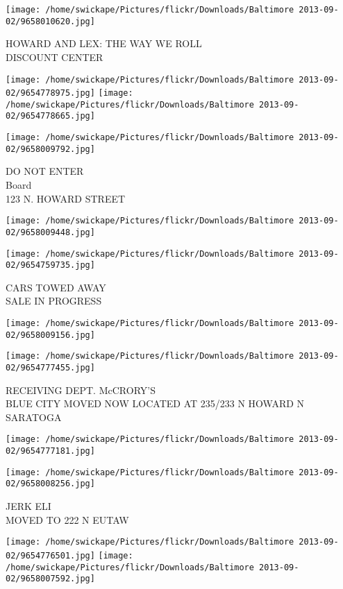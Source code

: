 \documentclass[10pt,letterpaper]{article}
\begin{document}
\vspace{0.25in}
\texttt{[image: /home/swickape/Pictures/flickr/Downloads/Baltimore 2013-09-02/9658010620.jpg]}

HOWARD AND LEX: THE WAY WE ROLL\\
DISCOUNT CENTER
\pagebreak

\texttt{[image: /home/swickape/Pictures/flickr/Downloads/Baltimore 2013-09-02/9654778975.jpg]}
\texttt{[image: /home/swickape/Pictures/flickr/Downloads/Baltimore 2013-09-02/9654778665.jpg]}

\vspace{0.25in}
\texttt{[image: /home/swickape/Pictures/flickr/Downloads/Baltimore 2013-09-02/9658009792.jpg]}

DO NOT ENTER\\
Board\\
123 N. HOWARD STREET
\pagebreak

\texttt{[image: /home/swickape/Pictures/flickr/Downloads/Baltimore 2013-09-02/9658009448.jpg]}

\vspace{0.25in}
\texttt{[image: /home/swickape/Pictures/flickr/Downloads/Baltimore 2013-09-02/9654759735.jpg]}

CARS TOWED AWAY\\
SALE IN PROGRESS
\pagebreak

\texttt{[image: /home/swickape/Pictures/flickr/Downloads/Baltimore 2013-09-02/9658009156.jpg]}

\vspace{0.25in}
\texttt{[image: /home/swickape/Pictures/flickr/Downloads/Baltimore 2013-09-02/9654777455.jpg]}

RECEIVING DEPT. McCRORY'S\\
BLUE CITY MOVED NOW LOCATED AT 235/233 N HOWARD N SARATOGA
\pagebreak

\texttt{[image: /home/swickape/Pictures/flickr/Downloads/Baltimore 2013-09-02/9654777181.jpg]}

\vspace{0.25in}
\texttt{[image: /home/swickape/Pictures/flickr/Downloads/Baltimore 2013-09-02/9658008256.jpg]}

JERK ELI\\
MOVED TO 222 N EUTAW
\pagebreak

\texttt{[image: /home/swickape/Pictures/flickr/Downloads/Baltimore 2013-09-02/9654776501.jpg]}
\texttt{[image: /home/swickape/Pictures/flickr/Downloads/Baltimore 2013-09-02/9658007592.jpg]}
\end{document}
